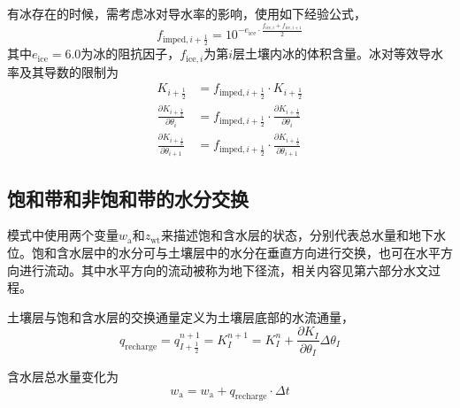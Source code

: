 有冰存在的时候，需考虑冰对导水率的影响，使用如下经验公式，
\begin{equation}
  {f}_{\mathrm{imped},i+\frac{1}{2}}=10^{-e_{\mathrm{ice}}\cdot\frac{f_{\mathrm{ice},i}+f_{\mathrm{ice},i +1}}{2}}
\end{equation}
其中$e_{\mathrm{ice}}=6.0$为冰的阻抗因子，$f_{\mathrm{ice},i}$为第$i$层土壤内冰的体积含量。冰对等效导水率及其导数的限制为
\begin{equation}
  \begin{aligned}
    K_{i+\frac{1}{2}} & = {f}_{\mathrm{imped},i+\frac{1}{2}} \cdot K_{i+\frac{1}{2}} \\
    \frac{\partial K_{i+\frac{1}{2}}}{\partial \theta_{i}}
    & = {f}_{\mathrm{imped},i+\frac{1}{2}} \cdot \frac{\partial K_{i+\frac{1}{2}}}{\partial \theta_{i}} \\
    \frac{\partial K_{i+\frac{1}{2}}}{\partial \theta_{i+1}} & =
    {f}_{\mathrm{imped},i+\frac{1}{2}} \cdot \frac{\partial K_{i+\frac{1}{2}}}{\partial \theta_{i+1}}
  \end{aligned}
\end{equation}

\subsection{饱和带和非饱和带的水分交换} \label{sec:exchange_sat_unsat}
模式中使用两个变量$w_{\mathrm {a}} $和$z_{\mathrm{wt}}$来描述饱和含水层的状态，分别代表总水量和地下水位。饱和含水层中的水分可与土壤层中的水分在垂直方向进行交换，也可在水平方向进行流动。其中水平方向的流动被称为地下径流，相关内容见第六部分水文过程。

土壤层与饱和含水层的交换通量定义为土壤层底部的水流通量，
\begin{equation}
  {q}_{\mathrm{recharge}}=q_{I+\frac{1}{2}}^{n+1}=K_{I}^{n+1} = K_I^n + \frac{\partial K_{I}}{\partial \theta_{I}} \Delta \theta_{I}
\end{equation}

含水层总水量变化为
\begin{equation}
  w_{\mathrm{a}}=w_{\mathrm{a}}+q_{\mathrm{recharge}} \cdot \Delta t
\end{equation}

